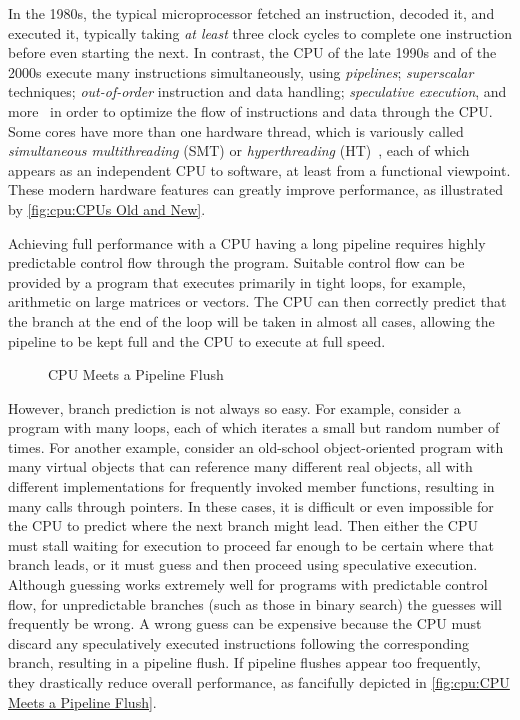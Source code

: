 In the 1980s, the typical microprocessor fetched an instruction, decoded
it, and executed it, typically taking \emph{at least} three clock cycles
to complete one instruction before even starting the next.
In contrast, the CPU of the late 1990s and of the 2000s execute many
instructions simultaneously, using \emph{pipelines}; \emph{superscalar}
techniques; \emph{out-of-order} instruction and data handling;
\emph{speculative execution}, and
more~\cite{Hennessy2017,Hennessy2011}
in order to optimize the flow of instructions and data through the CPU\@.
Some cores have more than one hardware thread, which is variously called
\emph{simultaneous multithreading} (SMT) or \emph{hyperthreading}
(HT)~\cite{JFennel1973SMT},
each of which appears as
an independent CPU to software, at least from a functional viewpoint.
These modern hardware features can greatly improve performance, as
illustrated by \cref{fig:cpu:CPUs Old and New}.

Achieving full performance with a CPU having a long pipeline requires
highly predictable control flow through the program.
Suitable control flow can be provided by a program that executes primarily
in tight loops, for example, arithmetic on large matrices or vectors.
The CPU can then correctly predict that the branch at the end of the loop
will be taken in almost all cases,
allowing the pipeline to be kept full and the CPU to execute at full speed.

\begin{figure}
\centering
{}
\caption{CPU Meets a Pipeline Flush}
\end{figure}

However, branch prediction is not always so easy.
For example, consider a program with many loops, each of which iterates
a small but random number of times.
For another example, consider an old-school object-oriented program with
many virtual objects that can reference many different real objects, all
with different implementations for frequently invoked member functions,
resulting in many calls through pointers.
In these cases, it is difficult or even
impossible for the CPU to predict where the next branch might lead.
Then either the CPU must stall waiting for execution to proceed far
enough to be certain where that branch leads, or it must guess and
then proceed using speculative execution.
Although guessing works extremely well for programs with predictable
control flow, for unpredictable branches (such as those in binary search)
the guesses will frequently be wrong.
A wrong guess can be expensive because the CPU must discard any
speculatively executed instructions following the corresponding
branch, resulting in a pipeline flush.
If pipeline flushes appear too frequently, they drastically reduce
overall performance, as fancifully depicted in
\cref{fig:cpu:CPU Meets a Pipeline Flush}.

